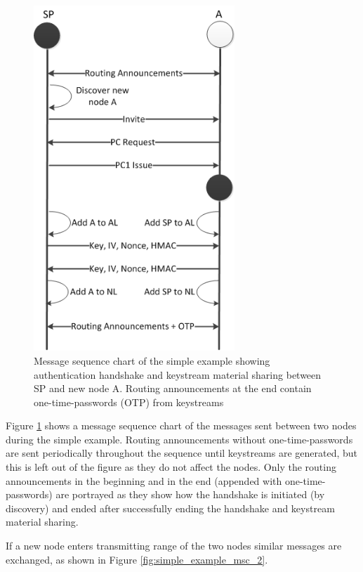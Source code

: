 \begin{figure}[ht]
	\centering
  	\includegraphics[height=13cm]{images/simple_example_msc.png}
  	\caption{Message sequence chart of the simple example showing authentication
  	  handshake and keystream material sharing between SP and new node A. Routing
  	  announcements at the end contain one-time-passwords (OTP) from keystreams}
	\label{fig:simple_example_msc}
\end{figure}

Figure \ref{fig:simple_example_msc} shows a message sequence chart of the
messages sent between two nodes during the simple example. Routing announcements
without one-time-passwords are sent periodically throughout the sequence until
keystreams are generated, but this is left out of the figure as they do not
affect the nodes. Only the routing announcements in the beginning and in the end
(appended with one-time-passwords) are portrayed as they show how the handshake
is initiated (by discovery) and ended after successfully ending the handshake
and keystream material sharing.

If a new node enters transmitting range of the two nodes similar messages are
exchanged, as shown in Figure \ref{fig:simple_example_msc_2}.

